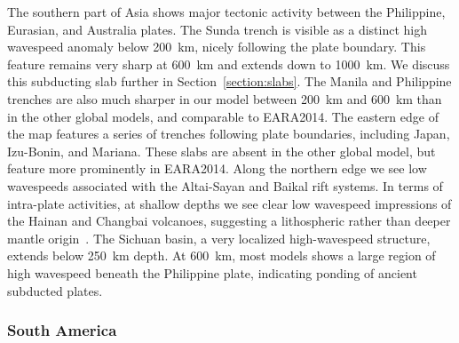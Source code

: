 The southern part of Asia shows major tectonic activity between the
Philippine, Eurasian, and Australia plates.
The Sunda trench is visible as a distinct high wavespeed anomaly below 200~km,
nicely following the plate boundary.
This feature remains very sharp at 600~km and extends
down to 1000~km.
We discuss this subducting slab further in Section~\ref{section:slabs}.
The Manila and Philippine trenches are also much sharper in our model between 200~km and
600~km than in the other global models, and comparable to EARA2014.
The eastern edge of the map features a series of trenches following plate boundaries,
including Japan, Izu-Bonin, and Mariana.
These slabs are absent in the other global model,
but feature more prominently in EARA2014.
Along the northern edge we see low wavespeeds associated with the
Altai-Sayan and Baikal rift systems.
In terms of intra-plate activities,
at shallow depths we see clear low wavespeed impressions of the Hainan and Changbai volcanoes,
suggesting a lithospheric rather than deeper mantle origin~\cite{yin2000geologic}.
The Sichuan basin, a very localized high-wavespeed structure, extends below
250~km depth. At 600~km, most models shows a large region of high wavespeed
beneath the Philippine plate, indicating ponding of ancient subducted plates.

\subsubsection{South America}

